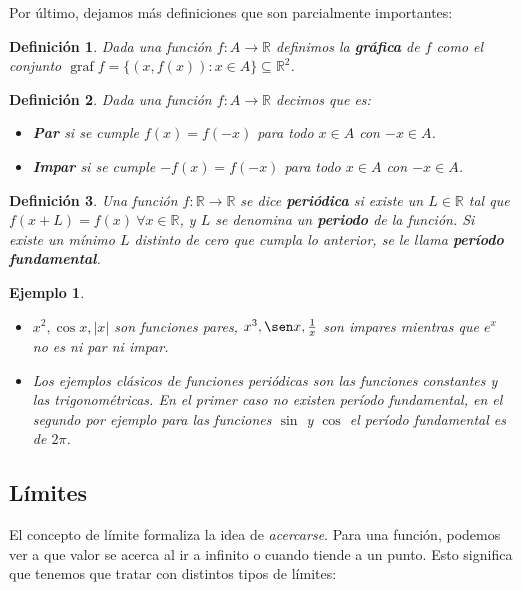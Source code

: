 \documentclass{article}
\newtheorem{define}{Definición}
\newtheorem{ejem}{Ejemplo}
\DeclareMathOperator{\graf}{graf}
\newcommand{\reales}{\mathbb{R}}
\begin{document}
Por último, dejamos más definiciones que son parcialmente importantes:

\begin{define}
	Dada una función $f: A \rightarrow \reales$ definimos la \textbf{gráfica} de $f$ como el conjunto $\graf f = \{(x, f(x)) : x \in A \} \subseteq \reales^2$.
\end{define}

\begin{define}
	Dada una función $f: A \rightarrow \reales$ decimos que es:
	\begin{itemize}
		\item
		\textbf{Par} si se cumple $f(x) = f(-x)$ para todo $x \in A$ con $-x \in A$.
		
		\item
		\textbf{Impar} si se cumple $-f(x) = f(-x)$ para todo $x \in A$ con $-x \in A$.
	\end{itemize}
\end{define}

\begin{define}
	Una función $f: \reales \rightarrow \reales$ se dice \textbf{periódica} si existe un $L\in \reales$ tal que $f(x+L) = f(x)\ \forall x \in \reales$, y $L$ se denomina un \textbf{periodo} de la función. Si existe un mínimo $L$ distinto de cero que cumpla lo anterior, se le llama \textbf{período fundamental}.
\end{define}

\begin{ejem}
	\begin{itemize}
		\item
		$x^2, \cos x, |x|$ son funciones pares, $x^3, \sen x, \frac{1}{x}$ son impares mientras que $e^x$ no es ni par ni impar.
		\item
		Los ejemplos clásicos de funciones periódicas son las funciones constantes y las trigonométricas. En el primer caso no existen período fundamental, en el segundo por ejemplo para las funciones $\sin$ y $\cos$ el período fundamental es de $2\pi$.
	\end{itemize}
\end{ejem}


\subsection{Límites}
El concepto de límite formaliza la idea de \textit{acercarse}. Para una función, podemos ver a que valor se acerca al ir a infinito o cuando tiende a un punto. Esto significa que tenemos que tratar con distintos tipos de límites:
\end{document}
